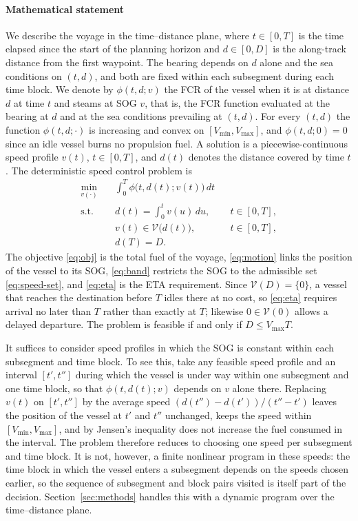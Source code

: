 \documentclass[review,authoryear]{elsarticle}
\begin{document}
\paragraph{Mathematical statement}
We describe the voyage in the time--distance plane, where $t\in[0,T]$ is the time elapsed since the start of the planning horizon and $d\in[0,D]$ is the along-track distance from the first waypoint. The bearing depends on $d$ alone and the sea conditions on $(t,d)$, and both are fixed within each subsegment during each time block. We denote by $\phi(t,d;v)$ the FCR of the vessel when it is at distance $d$ at time $t$ and steams at SOG $v$, that is, the FCR function evaluated at the bearing at $d$ and at the sea conditions prevailing at $(t,d)$. For every $(t,d)$ the function $\phi(t,d;\cdot)$ is increasing and convex on $[V_{\min},V_{\max}]$, and $\phi(t,d;0)=0$ since an idle vessel burns no propulsion fuel. A solution is a piecewise-continuous speed profile $v(t)$, $t\in[0,T]$, and $d(t)$ denotes the distance covered by time $t$. The deterministic speed control problem is
\begin{subequations}
	\label{eq:det}
	\begin{align}
		\min_{v(\cdot)}\quad & \int_{0}^{T}\phi\bigl(t,d(t);v(t)\bigr)\,dt \label{eq:obj}\\
		\text{s.t.}\quad & d(t)=\int_{0}^{t}v(u)\,du, && t\in[0,T], \label{eq:motion}\\
		& v(t)\in\mathcal{V}\bigl(d(t)\bigr), && t\in[0,T], \label{eq:band}\\
		& d(T)=D. \label{eq:eta}
	\end{align}
\end{subequations}
The objective \eqref{eq:obj} is the total fuel of the voyage, \eqref{eq:motion} links the position of the vessel to its SOG, \eqref{eq:band} restricts the SOG to the admissible set \eqref{eq:speed-set}, and \eqref{eq:eta} is the ETA requirement. Since $\mathcal{V}(D)=\{0\}$, a vessel that reaches the destination before $T$ idles there at no cost, so \eqref{eq:eta} requires arrival no later than $T$ rather than exactly at $T$; likewise $0\in\mathcal{V}(0)$ allows a delayed departure. The problem is feasible if and only if $D\le V_{\max}T$.

It suffices to consider speed profiles in which the SOG is constant within each subsegment and time block. To see this, take any feasible speed profile and an interval $[t',t'']$ during which the vessel is under way within one subsegment and one time block, so that $\phi(t,d(t);v)$ depends on $v$ alone there. Replacing $v(t)$ on $[t',t'']$ by the average speed $(d(t'')-d(t'))/(t''-t')$ leaves the position of the vessel at $t'$ and $t''$ unchanged, keeps the speed within $[V_{\min},V_{\max}]$, and by Jensen's inequality does not increase the fuel consumed in the interval. The problem therefore reduces to choosing one speed per subsegment and time block. It is not, however, a finite nonlinear program in these speeds: the time block in which the vessel enters a subsegment depends on the speeds chosen earlier, so the sequence of subsegment and block pairs visited is itself part of the decision. Section~\ref{sec:methods} handles this with a dynamic program over the time--distance plane.
\end{document}
